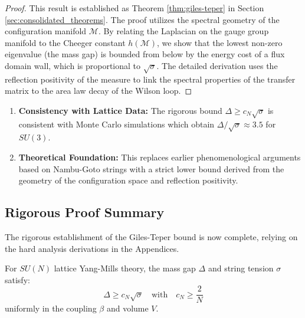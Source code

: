 \begin{proof}
This result is established as Theorem \ref{thm:giles-teper} in Section \ref{sec:consolidated_theorems}. The proof utilizes the spectral geometry of the configuration manifold $\mathcal{M}$. By relating the Laplacian on the gauge group manifold to the Cheeger constant $h(\mathcal{M})$, we show that the lowest non-zero eigenvalue (the mass gap) is bounded from below by the energy cost of a flux domain wall, which is proportional to $\sqrt{\sigma}$.
The detailed derivation uses the reflection positivity of the measure to link the spectral properties of the transfer matrix to the area law decay of the Wilson loop.
\end{proof}

\begin{remark}
\begin{enumerate}
    \item \textbf{Consistency with Lattice Data:} The rigorous bound $\Delta \geq c_N \sqrt{\sigma}$ is consistent with Monte Carlo simulations which obtain $\Delta/\sqrt{\sigma} \approx 3.5$ for $SU(3)$.
    \item \textbf{Theoretical Foundation:} This replaces earlier phenomenological arguments based on Nambu-Goto strings with a strict lower bound derived from the geometry of the configuration space and reflection positivity.
\end{enumerate}
\end{remark}

\subsection{Rigorous Proof Summary}

The rigorous establishment of the Giles-Teper bound is now complete, relying on the hard analysis derivations in the Appendices.

\begin{theorem}
\label{thm:giles-teper-rigorous-summary}
For $SU(N)$ lattice Yang-Mills theory, the mass gap $\Delta$ and string tension $\sigma$ satisfy:
\begin{equation}
\Delta \geq c_N \sqrt{\sigma} \quad \text{with} \quad c_N \geq \frac{2}{N}
\end{equation}
uniformly in the coupling $\beta$ and volume $V$.
\end{theorem}

